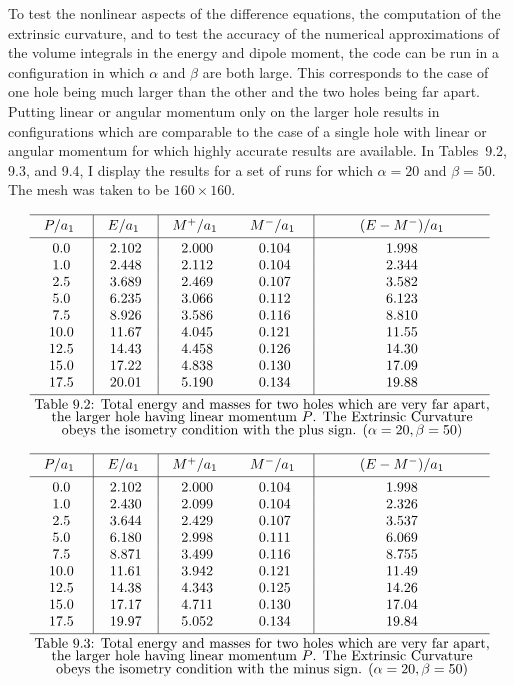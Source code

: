 To test the nonlinear aspects of the difference equations, the computation of
the extrinsic curvature, and to test the accuracy of the numerical approximations
of the volume integrals in the energy and dipole moment, the code can be run in a
configuration in which $\alpha$ and $\beta$ are both large.  This corresponds to
the case of one hole being much larger than the other and the two holes being
far apart.  Putting linear or angular momentum only on the larger hole results
in configurations which are comparable to the case of a single hole with linear
or angular momentum for which highly accurate results are available.  In
Tables~9.2, 9.3, and 9.4, I display the results for a set of runs for which
$\alpha=20$ and $\beta=50$.  The mesh was taken to be $160\times 160$.

$$
\vbox{\offinterlineskip
\hrule
\halign{\quad\hfil#\hfil\quad&\vrule#&
\strut\quad\hfil#\hfil\quad&\vrule#&
\quad\hfil#\hfil\quad&
\quad\hfil#\hfil\quad&\vrule#&
\quad\hfil#\hfil\quad\cr
\omit&height2pt&\omit&&\omit&\omit&&\omit\cr
 $P/a_1$ &&	$E/a_1$ &&	$M^+/a_1$ &	$M^-/a_1$ &&	$(E - M^-)/a_1$\cr
\omit&height2pt&\omit&&\omit&\omit&&\omit\cr
\noalign{\hrule}
\omit&height2pt&\omit&&\omit&\omit&&\omit\cr
 0.0&&2.102&&2.000&0.104&&1.998\cr
 1.0&&2.448&&2.112&0.104&&2.344\cr
 2.5&&3.689&&2.469&0.107&&3.582\cr
 5.0&&6.235&&3.066&0.112&&6.123\cr
 7.5&&8.926&&3.586&0.116&&8.810\cr
 10.0&&11.67&&4.045&0.121&&11.55\cr
 12.5&&14.43&&4.458&0.126&&14.30\cr
 15.0&&17.22&&4.838&0.130&&17.09\cr
 17.5&&20.01&&5.190&0.134&&19.88\cr
\omit&height2pt&\omit&&\omit&\omit&&\omit\cr
\noalign{\hrule}
\noalign{\smallskip}
\multispan8 \hfil Table~9.2:  Total energy and masses for two holes which are
very far apart,\hfil\cr
\multispan8 
\hfil the larger hole having linear momentum $P$.  The Extrinsic
Curvature\hfil\cr
\multispan8 \hfil obeys the isometry condition with the plus
sign.  $(\alpha=20,\beta=50)$\hfil\cr}}
$$

$$
\vbox{\offinterlineskip
\hrule
\halign{\quad\hfil#\hfil\quad&\vrule#&
\strut\quad\hfil#\hfil\quad&\vrule#&
\quad\hfil#\hfil\quad&
\quad\hfil#\hfil\quad&\vrule#&
\quad\hfil#\hfil\quad\cr
\omit&height2pt&\omit&&\omit&\omit&&\omit\cr
 $P/a_1$ &&	$E/a_1$ &&	$M^+/a_1$ &	$M^-/a_1$ &&	$(E - M^-)/a_1$\cr
\omit&height2pt&\omit&&\omit&\omit&&\omit\cr
\noalign{\hrule}
\omit&height2pt&\omit&&\omit&\omit&&\omit\cr
	0.0&&2.102&&2.000&0.104&&1.998\cr
	1.0&&2.430&&2.099&0.104&&2.326\cr
	2.5&&3.644&&2.429&0.107&&3.537\cr
	5.0&&6.180&&2.998&0.111&&6.069\cr
	7.5&&8.871&&3.499&0.116&&8.755\cr
	10.0&&11.61&&3.942&0.121&&11.49\cr
	12.5&&14.38&&4.343&0.125&&14.26\cr
	15.0&&17.17&&4.711&0.130&&17.04\cr
	17.5&&19.97&&5.052&0.134&&19.84\cr
\omit&height2pt&\omit&&\omit&\omit&&\omit\cr
\noalign{\hrule}
\noalign{\smallskip}
\multispan8 \hfil Table~9.3:  Total energy and masses for two holes which are
very far apart,\hfil\cr
\multispan8 \hfil the larger hole having linear momentum $P$.  The Extrinsic
Curvature\hfil\cr
\multispan8 \hfil obeys the isometry condition with the minus sign. 
$(\alpha=20,\beta=50)$\hfil\cr}}
$$

